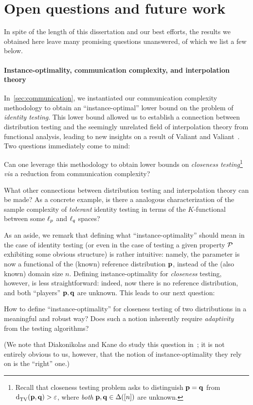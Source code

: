 \section*{Open questions and future work}

In spite of the length of this dissertation and our best efforts, the results we obtained here leave many promising questions unanswered, of which we list a few below.

\paragraph*{Instance-optimality, communication complexity, and interpolation theory}
In~\cref{sec:communication}, we instantiated our communication complexity methodology to obtain an ``instance-optimal'' lower bound on the problem of \emph{identity testing}. This lower bound allowed us to establish a connection between distribution testing and the seemingly unrelated field of interpolation theory from functional analysis, leading to new insights on a result of Valiant and Valiant~\cite{VV:14}. Two questions immediately come to mind:
\begin{question}
  Can one leverage this methodology to obtain lower bounds on \emph{closeness testing}\footnote{Recall that closeness testing problem asks to distinguish $\p=\q$ from $\totalvardist{\p}{\q}>\eps$, where \emph{both} $\p,\q\in\distribs{[n]}$ are unknown.}{} \textit{via} a reduction from communication complexity?
\end{question}
\begin{question}
  What other connections between distribution testing and interpolation theory can be made? As a concrete example, is there a analogous characterization of the sample complexity of \emph{tolerant} identity testing in terms of the $K$-functional between some $\lp[p]$ and $\lp[q]$ spaces?
\end{question}
As an aside, we remark that defining what ``instance-optimality'' should mean  in the case of identity testing (or even in the case of testing a given property $\property$ exhibiting some obvious structure) is rather intuitive: namely, the parameter is now a functional of the (known) reference distribution $\p$, instead of the (also known) domain size $n$. Defining instance-optimality for \emph{closeness} testing, however, is less straightforward: indeed, now there is no reference distribution, and both ``players'' $\p,\q$ are unknown. This leads to our next question:
\begin{question}
  How to define ``instance-optimality'' for closeness testing of two distributions in a meaningful and robust way? Does such a notion inherently require \emph{adaptivity} from the testing algorithms?
\end{question}
\noindent (We note that Diakonikolas and Kane do study this question in~\cite{DK:16}; it is not entirely obvious to us, however, that the notion of instance-optimality they rely on is the ``right'' one.)

